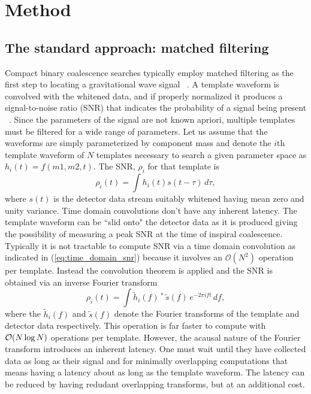 \section{Method}
\label{SECII}\label{sec:method}
\subsection{The standard approach: matched filtering}
Compact binary coalescence searches typically employ matched filtering as the
first step to locating a gravitational wave signal ~\cite{findchirppaper}.  
A template waveform is convolved with the whitened data, and if 
properly normalized it produces a signal-to-noise ratio (SNR) that indicates the
probability of a signal being present ~\cite{wainstein:1962}.  
Since the parameters of the signal are
not known apriori, multiple templates must be filtered for a wide range of
parameters.  Let us assume that the waveforms are simply parameterized by
component mass and denote the $i$th template waveform of $N$ templates necessary
to search a given parameter space as $h_i(t) = f(m1,m2,t)$.
The SNR, $\rho_i$ for that template is
\begin{equation}
\label{eq:time_domain_snr}
\rho_i(t) = \int h_i(t) s(t-\tau) \, d\tau,
\end{equation}
where $s(t)$ is the detector data stream suitably whitened having mean zero
and unity variance.  Time domain convolutions don't have any inherent latency. 
The template waveform can be ``slid onto" the detector data as it is produced
giving the possibility of measuring a peak SNR at the time of inspiral
coalescence.  Typically it is not tractable to compute SNR via a
time domain convolution as indicated in (\ref{eq:time_domain_snr}) because
it involves an $\mathcal{O}(N^2)$ operation per template. Instead the
convolution theorem is applied and the SNR is obtained via an inverse Fourier
transform
\begin{equation}
\label{eq:freq_domain_snr}
\rho_i(t) = \int \tilde{h}_i(f)\,^*\,\tilde{s}(f)\,e^{-2\pi i f t}\, df,
\end{equation}
where the $\tilde{h}_i(f)$ and $\tilde{s}(f)$ denote the Fourier transforms
of the template and detector data respectively.  This operation is far
faster to compute with $\mathcal{O}(N\,{\rm log}\,N)$ operations per template.  
However, the acausal nature of the Fourier transform introduces an inherent
latency.  One must wait until they have collected data as long as their 
signal and for minimally overlapping computations that means having a latency
about as long as the template waveform.  The latency can be reduced by having
redudant overlapping transforms, but at an additional cost.  

